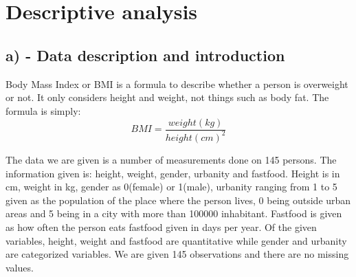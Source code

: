 \documentclass{memoir}
\begin{document}
\newpage
\begin{KeepFromToc}
	\tableofcontents 
	\thispagestyle{empty}
\end{KeepFromToc}
\newpage


\chapter[Descriptive analysis]{\\ Descriptive analysis} %

\section{a) - Data description and introduction}
Body Mass Index or BMI is a formula to describe whether a person is overweight or not. It only considers height and weight, not things such as body fat. The formula is simply: 
$$ BMI = \frac{weight(kg)}{height(cm)^2}$$

The data we are given is a number of measurements done on 145 persons. The information given is: height, weight, gender, urbanity and fastfood. Height is in cm, weight in kg, gender as 0(female) or 1(male), urbanity ranging from 1 to 5 given as the population of the place where the person lives, 0 being outside urban areas and 5 being in a city with more than 100000 inhabitant. Fastfood is given as how often the person eats fastfood given in days per year. 
Of the given variables, height, weight and fastfood are quantitative while gender and urbanity are categorized variables. We are given 145 observations and there are no missing values.
\end{document}
